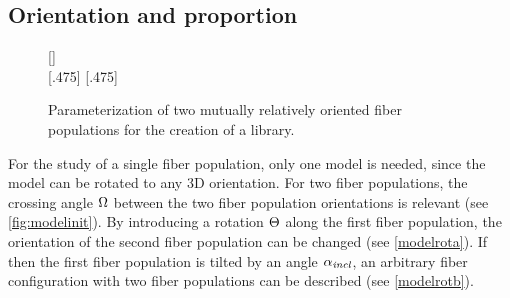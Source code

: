 \subsection{Orientation and proportion}\label{sec:modelParamet}
%
\begin{figure}[t]
\centering
\setlength{\tikzwidth}{0.40\textwidth}
{}
[\textwidth]{}
\\
%
[.475\textwidth]{}\hfill
{}
[.475\textwidth]{}
\caption{Parameterization of two mutually relatively oriented fiber populations for the creation of a library.}
\label{fig:twomodelpopdesign}
\end{figure}
%
For the study of a single fiber population, only one model is needed, since the model can be rotated to any 3D orientation. 
For two fiber populations, the crossing angle $\textnormal{$\Omega$}$ between the two fiber population orientations is relevant (see \cref{fig:modelinit}).
By introducing a rotation $\textnormal{$\Theta$}$ along the first fiber population, the orientation of the second fiber population can be changed (see \cref{modelrota}).
If then the first fiber population is tilted by an angle $\textnormal{$\alpha_{\mathit{incl}}$}$, an arbitrary fiber configuration with two fiber populations can be described (see \cref{modelrotb}).
